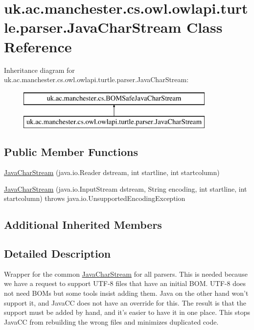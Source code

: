 \hypertarget{classuk_1_1ac_1_1manchester_1_1cs_1_1owl_1_1owlapi_1_1turtle_1_1parser_1_1_java_char_stream}{\section{uk.\-ac.\-manchester.\-cs.\-owl.\-owlapi.\-turtle.\-parser.\-Java\-Char\-Stream Class Reference}
\label{classuk_1_1ac_1_1manchester_1_1cs_1_1owl_1_1owlapi_1_1turtle_1_1parser_1_1_java_char_stream}
}
Inheritance diagram for uk.\-ac.\-manchester.\-cs.\-owl.\-owlapi.\-turtle.\-parser.\-Java\-Char\-Stream\-:\begin{figure}[H]
\begin{center}
\leavevmode
\includegraphics[height=2.000000cm]{classuk_1_1ac_1_1manchester_1_1cs_1_1owl_1_1owlapi_1_1turtle_1_1parser_1_1_java_char_stream}
\end{center}
\end{figure}
\subsection*{Public Member Functions}
\begin{DoxyCompactItemize}
\item 
\hyperlink{classuk_1_1ac_1_1manchester_1_1cs_1_1owl_1_1owlapi_1_1turtle_1_1parser_1_1_java_char_stream_a1622aa4170ea9b649a98e05ee988b8c7}{Java\-Char\-Stream} (java.\-io.\-Reader dstream, int startline, int startcolumn)
\item 
\hyperlink{classuk_1_1ac_1_1manchester_1_1cs_1_1owl_1_1owlapi_1_1turtle_1_1parser_1_1_java_char_stream_afffe2352f876e28f91fc49b48bfbc0c9}{Java\-Char\-Stream} (java.\-io.\-Input\-Stream dstream, String encoding, int startline, int startcolumn)  throws java.\-io.\-Unsupported\-Encoding\-Exception 
\end{DoxyCompactItemize}
\subsection*{Additional Inherited Members}


\subsection{Detailed Description}
Wrapper for the common \hyperlink{classuk_1_1ac_1_1manchester_1_1cs_1_1owl_1_1owlapi_1_1turtle_1_1parser_1_1_java_char_stream}{Java\-Char\-Stream} for all parsers. This is needed because we have a request to support U\-T\-F-\/8 files that have an initial B\-O\-M. U\-T\-F-\/8 does not need B\-O\-Ms but some tools insist adding them. Java on the other hand won't support it, and Java\-C\-C does not have an override for this. The result is that the support must be added by hand, and it's easier to have it in one place. This stops Java\-C\-C from rebuilding the wrong files and minimizes duplicated code. 

